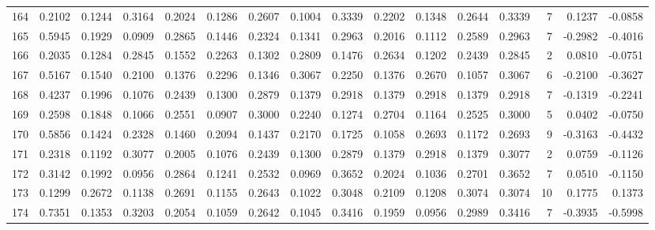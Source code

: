 \begin{tabular}{lrrrrrrrrrrrrrrr}
164 &      0.2102 &  0.1244 &  0.3164 &  0.2024 &  0.1286 &  0.2607 &  0.1004 &  0.3339 &  0.2202 &  0.1348 &   0.2644 &     0.3339 &      7 &                    0.1237 &                    -0.0858 \\
165 &      0.5945 &  0.1929 &  0.0909 &  0.2865 &  0.1446 &  0.2324 &  0.1341 &  0.2963 &  0.2016 &  0.1112 &   0.2589 &     0.2963 &      7 &                   -0.2982 &                    -0.4016 \\
166 &      0.2035 &  0.1284 &  0.2845 &  0.1552 &  0.2263 &  0.1302 &  0.2809 &  0.1476 &  0.2634 &  0.1202 &   0.2439 &     0.2845 &      2 &                    0.0810 &                    -0.0751 \\
167 &      0.5167 &  0.1540 &  0.2100 &  0.1376 &  0.2296 &  0.1346 &  0.3067 &  0.2250 &  0.1376 &  0.2670 &   0.1057 &     0.3067 &      6 &                   -0.2100 &                    -0.3627 \\
168 &      0.4237 &  0.1996 &  0.1076 &  0.2439 &  0.1300 &  0.2879 &  0.1379 &  0.2918 &  0.1379 &  0.2918 &   0.1379 &     0.2918 &      7 &                   -0.1319 &                    -0.2241 \\
169 &      0.2598 &  0.1848 &  0.1066 &  0.2551 &  0.0907 &  0.3000 &  0.2240 &  0.1274 &  0.2704 &  0.1164 &   0.2525 &     0.3000 &      5 &                    0.0402 &                    -0.0750 \\
170 &      0.5856 &  0.1424 &  0.2328 &  0.1460 &  0.2094 &  0.1437 &  0.2170 &  0.1725 &  0.1058 &  0.2693 &   0.1172 &     0.2693 &      9 &                   -0.3163 &                    -0.4432 \\
171 &      0.2318 &  0.1192 &  0.3077 &  0.2005 &  0.1076 &  0.2439 &  0.1300 &  0.2879 &  0.1379 &  0.2918 &   0.1379 &     0.3077 &      2 &                    0.0759 &                    -0.1126 \\
172 &      0.3142 &  0.1992 &  0.0956 &  0.2864 &  0.1241 &  0.2532 &  0.0969 &  0.3652 &  0.2024 &  0.1036 &   0.2701 &     0.3652 &      7 &                    0.0510 &                    -0.1150 \\
173 &      0.1299 &  0.2672 &  0.1138 &  0.2691 &  0.1155 &  0.2643 &  0.1022 &  0.3048 &  0.2109 &  0.1208 &   0.3074 &     0.3074 &     10 &                    0.1775 &                     0.1373 \\
174 &      0.7351 &  0.1353 &  0.3203 &  0.2054 &  0.1059 &  0.2642 &  0.1045 &  0.3416 &  0.1959 &  0.0956 &   0.2989 &     0.3416 &      7 &                   -0.3935 &                    -0.5998 \\

\end{tabular}
